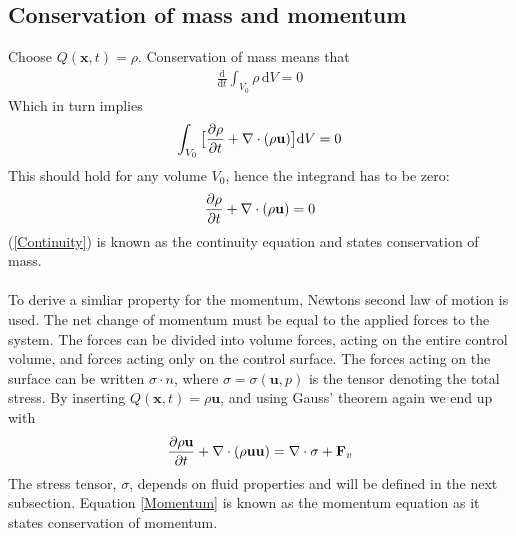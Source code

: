 \subsection{Conservation of mass and momentum}
Choose $Q(\mathbf{x},t) = \rho$. Conservation of mass means that
\begin{align*} 
\frac{\mathrm{d}}{\mathrm{d}t} \int_{V_0} \rho \, \mathrm{d}V = 0
\end{align*}
Which in turn implies
\begin{align}
\int_{V_0} \big{[}\frac{\partial \rho}{\partial t} + \nabla \cdot (\rho \mathbf{u}) \big{]}\mathrm{d}V = 0
\end{align}
This should hold for any volume $V_0$, hence the integrand has to be zero:
\begin{align} 
\frac{\partial \rho}{\partial t} + \nabla \cdot (\rho \mathbf{u}) = 0 \label{Continuity}
\end{align}
(\ref{Continuity}) is known as the continuity equation and states conservation of mass. 
\\
\\
To derive a simliar property for the momentum, Newtons second law of motion is used. The net change of momentum must be equal to the applied forces to the system. The forces can be divided into volume forces, acting on the entire control volume, and forces acting only on the control surface. The forces acting on the surface can be written $\sigma \cdot n$, where $\sigma = \sigma(\mathbf{u}, p)$ is the tensor denoting the total stress. By inserting $Q(\mathbf{x},t) = \rho \mathbf{u} $, and using Gauss' theorem again we end up with
\begin{align}
\frac{\partial \rho \mathbf{u}}{\partial t} + \nabla \cdot (\rho \mathbf{u}\mathbf{u} ) = \nabla \cdot \sigma + \mathbf{F}_v \label{Momentum}
\end{align} 
The stress tensor, $\sigma$, depends on fluid properties and will be defined in the next subsection. Equation \ref{Momentum} is known as the momentum equation as it states conservation of momentum.
